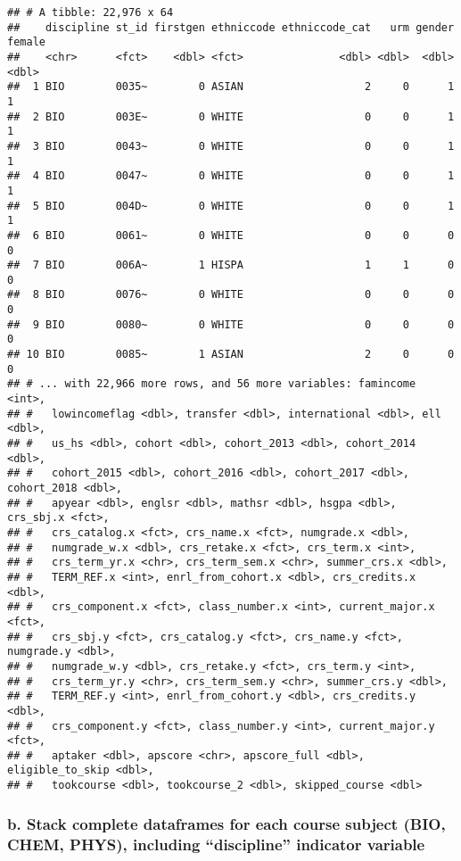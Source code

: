 \documentclass[]{article}
\begin{document}
\begin{verbatim}
## # A tibble: 22,976 x 64
##    discipline st_id firstgen ethniccode ethniccode_cat   urm gender female
##    <chr>      <fct>    <dbl> <fct>               <dbl> <dbl>  <dbl>  <dbl>
##  1 BIO        0035~        0 ASIAN                   2     0      1      1
##  2 BIO        003E~        0 WHITE                   0     0      1      1
##  3 BIO        0043~        0 WHITE                   0     0      1      1
##  4 BIO        0047~        0 WHITE                   0     0      1      1
##  5 BIO        004D~        0 WHITE                   0     0      1      1
##  6 BIO        0061~        0 WHITE                   0     0      0      0
##  7 BIO        006A~        1 HISPA                   1     1      0      0
##  8 BIO        0076~        0 WHITE                   0     0      0      0
##  9 BIO        0080~        0 WHITE                   0     0      0      0
## 10 BIO        0085~        1 ASIAN                   2     0      0      0
## # ... with 22,966 more rows, and 56 more variables: famincome <int>,
## #   lowincomeflag <dbl>, transfer <dbl>, international <dbl>, ell <dbl>,
## #   us_hs <dbl>, cohort <dbl>, cohort_2013 <dbl>, cohort_2014 <dbl>,
## #   cohort_2015 <dbl>, cohort_2016 <dbl>, cohort_2017 <dbl>, cohort_2018 <dbl>,
## #   apyear <dbl>, englsr <dbl>, mathsr <dbl>, hsgpa <dbl>, crs_sbj.x <fct>,
## #   crs_catalog.x <fct>, crs_name.x <fct>, numgrade.x <dbl>,
## #   numgrade_w.x <dbl>, crs_retake.x <fct>, crs_term.x <int>,
## #   crs_term_yr.x <chr>, crs_term_sem.x <chr>, summer_crs.x <dbl>,
## #   TERM_REF.x <int>, enrl_from_cohort.x <dbl>, crs_credits.x <dbl>,
## #   crs_component.x <fct>, class_number.x <int>, current_major.x <fct>,
## #   crs_sbj.y <fct>, crs_catalog.y <fct>, crs_name.y <fct>, numgrade.y <dbl>,
## #   numgrade_w.y <dbl>, crs_retake.y <fct>, crs_term.y <int>,
## #   crs_term_yr.y <chr>, crs_term_sem.y <chr>, summer_crs.y <dbl>,
## #   TERM_REF.y <int>, enrl_from_cohort.y <dbl>, crs_credits.y <dbl>,
## #   crs_component.y <fct>, class_number.y <int>, current_major.y <fct>,
## #   aptaker <dbl>, apscore <chr>, apscore_full <dbl>, eligible_to_skip <dbl>,
## #   tookcourse <dbl>, tookcourse_2 <dbl>, skipped_course <dbl>
\end{verbatim}

\subsubsection{\texorpdfstring{b. Stack complete dataframes for each
course subject (BIO, CHEM, PHYS), including ``discipline'' indicator
variable}{b. Stack complete dataframes for each course subject (BIO, CHEM, PHYS), including discipline indicator variable}}\label{b.-stack-complete-dataframes-for-each-course-subject-bio-chem-phys-including-discipline-indicator-variable}
\end{document}

